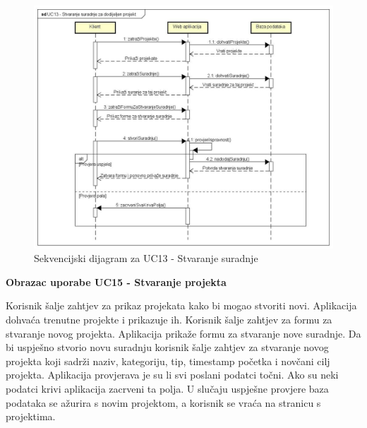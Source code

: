 				\begin{figure}[H]
					\includegraphics[scale=0.3]{slike/Sekvencijski dijagrami/UC13 - Stvaranje suradnje za dodijeljen projekt}
					\centering
					\caption{Sekvencijski dijagram za UC13 - Stvaranje suradnje}
					\label{fig:UC13}
				\end{figure}

				\textbf{Obrazac uporabe UC15 - Stvaranje projekta}\vspace{0.1cm}

				{Korisnik šalje zahtjev za prikaz projekata kako bi mogao stvoriti novi. Aplikacija dohvaća trenutne projekte i prikazuje ih. Korisnik šalje zahtjev za formu za stvaranje novog projekta. Aplikacija prikaže formu za stvaranje nove suradnje. Da bi uspješno  stvorio novu suradnju korisnik šalje zahtjev za stvaranje novog projekta koji sadrži naziv, kategoriju, tip, timestamp početka i novčani cilj projekta. Aplikacija provjerava je su li svi poslani podatci točni. Ako su neki podatci krivi aplikacija zacrveni ta polja. U slučaju uspješne provjere baza podataka se ažurira s novim projektom, a korisnik se vraća na stranicu s projektima.}

